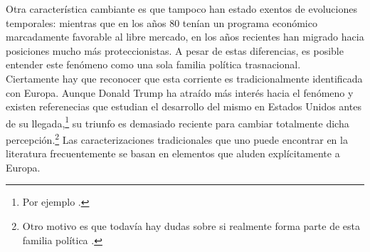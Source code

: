 Otra característica cambiante es que tampoco han estado exentos de evoluciones temporales: mientras que en los años 80 tenían un programa económico marcadamente favorable al libre mercado, en los años recientes han migrado hacia posiciones mucho más proteccionistas. A pesar de estas diferencias, es posible entender este fenómeno como una sola familia política trasnacional.\\

Ciertamente hay que reconocer que esta corriente es tradicionalmente identificada con Europa. Aunque Donald Trump ha atraído más interés hacia el fenómeno y existen referenecias que estudian el desarrollo del mismo en Estados Unidos antes de su llegada,\footnote{Por ejemplo \textcite{CoxDurham16}.} su triunfo es demasiado reciente para cambiar totalmente dicha percepción.\footnote{Otro motivo es que todavía hay dudas sobre si realmente forma parte de esta familia política \parencite{Mudde17}.} Las caracterizaciones tradicionales que uno puede encontrar en la literatura frecuentemente se basan en elementos que aluden explícitamente a Europa.\\ 

